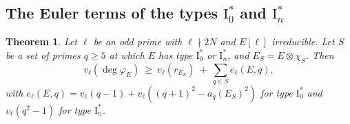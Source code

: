 \documentclass[11pt]{amsart}
\newtheorem{theorem}{Theorem}[section]
\theoremstyle{definition}
\newcommand{\degphi}{\deg\varphi_E}
\begin{document}
\subsection{The Euler terms of the types \texorpdfstring{$\mathrm{I}_0^*$ and $\mathrm{I}_n^*$}{I0* and In*}}

\begin{theorem}\label{thm:euler}
Let $\ell$ be an odd prime with $\ell\nmid 2N$ and $E[\ell]$ irreducible. Let $S$ be a set of primes $q\ge5$ at which $E$ has type $\mathrm{I}_0^*$ or $\mathrm{I}_n^*$, and $E_S=E\otimes\chi_S$. Then
\[
v_\ell(\degphi)\ \ge\ v_\ell(r_{E_S})\ +\ \sum_{q\in S}e_\ell(E,q),
\]
with $e_\ell(E,q)=v_\ell(q-1)+v_\ell((q+1)^2-a_q(E_S)^2)$ for type $\mathrm{I}_0^*$ and $v_\ell(q^2-1)$ for type $\mathrm{I}_n^*$.
\end{theorem}
\end{document}
